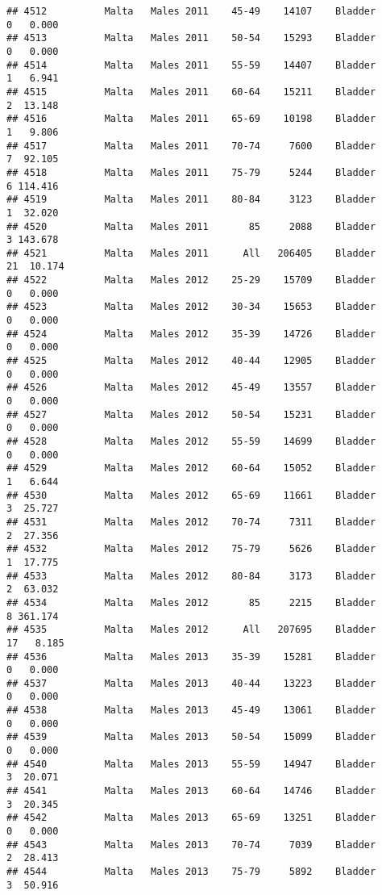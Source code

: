 \documentclass[
]{article}
\begin{document}
\begin{verbatim}
## 4512          Malta   Males 2011    45-49    14107    Bladder      0   0.000
## 4513          Malta   Males 2011    50-54    15293    Bladder      0   0.000
## 4514          Malta   Males 2011    55-59    14407    Bladder      1   6.941
## 4515          Malta   Males 2011    60-64    15211    Bladder      2  13.148
## 4516          Malta   Males 2011    65-69    10198    Bladder      1   9.806
## 4517          Malta   Males 2011    70-74     7600    Bladder      7  92.105
## 4518          Malta   Males 2011    75-79     5244    Bladder      6 114.416
## 4519          Malta   Males 2011    80-84     3123    Bladder      1  32.020
## 4520          Malta   Males 2011       85     2088    Bladder      3 143.678
## 4521          Malta   Males 2011      All   206405    Bladder     21  10.174
## 4522          Malta   Males 2012    25-29    15709    Bladder      0   0.000
## 4523          Malta   Males 2012    30-34    15653    Bladder      0   0.000
## 4524          Malta   Males 2012    35-39    14726    Bladder      0   0.000
## 4525          Malta   Males 2012    40-44    12905    Bladder      0   0.000
## 4526          Malta   Males 2012    45-49    13557    Bladder      0   0.000
## 4527          Malta   Males 2012    50-54    15231    Bladder      0   0.000
## 4528          Malta   Males 2012    55-59    14699    Bladder      0   0.000
## 4529          Malta   Males 2012    60-64    15052    Bladder      1   6.644
## 4530          Malta   Males 2012    65-69    11661    Bladder      3  25.727
## 4531          Malta   Males 2012    70-74     7311    Bladder      2  27.356
## 4532          Malta   Males 2012    75-79     5626    Bladder      1  17.775
## 4533          Malta   Males 2012    80-84     3173    Bladder      2  63.032
## 4534          Malta   Males 2012       85     2215    Bladder      8 361.174
## 4535          Malta   Males 2012      All   207695    Bladder     17   8.185
## 4536          Malta   Males 2013    35-39    15281    Bladder      0   0.000
## 4537          Malta   Males 2013    40-44    13223    Bladder      0   0.000
## 4538          Malta   Males 2013    45-49    13061    Bladder      0   0.000
## 4539          Malta   Males 2013    50-54    15099    Bladder      0   0.000
## 4540          Malta   Males 2013    55-59    14947    Bladder      3  20.071
## 4541          Malta   Males 2013    60-64    14746    Bladder      3  20.345
## 4542          Malta   Males 2013    65-69    13251    Bladder      0   0.000
## 4543          Malta   Males 2013    70-74     7039    Bladder      2  28.413
## 4544          Malta   Males 2013    75-79     5892    Bladder      3  50.916

\end{verbatim}
\end{document}
